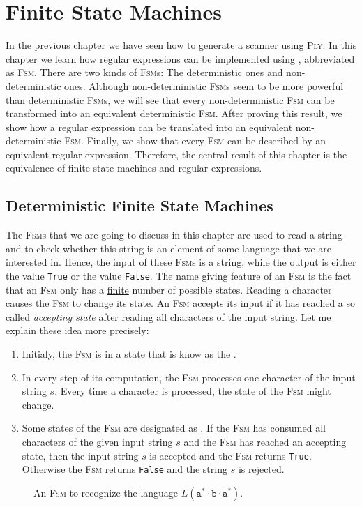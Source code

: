 \chapter{Finite State Machines\label{chapter:finit-state-machines.tex}} 
In the previous chapter we have seen how to generate a scanner using \textsc{Ply}.  In this chapter
we learn how regular expressions can be implemented using ,
abbreviated as \textsc{Fsm}.  There are two kinds of \textsc{Fsm}s: The deterministic ones and
non-deterministic ones.  Although non-deterministic \textsc{Fsm}s seem to be more powerful than
deterministic \textsc{Fsm}s, we will see that every non-deterministic \textsc{Fsm} can be transformed
into an equivalent deterministic \textsc{Fsm}.  After proving this result, we show how a regular
expression can be translated into an equivalent non-deterministic \textsc{Fsm}.  Finally, we show that every
\textsc{Fsm} can be described by an equivalent regular expression.  Therefore, the central result of
this chapter is the equivalence of finite state machines and regular expressions.


\section{Deterministic Finite State Machines}
The \textsc{Fsm}s that we are going to discuss in this chapter are used to read a string and
to check whether this string is an element of some language that we are interested in.  Hence, the input of these 
\textsc{Fsm}s is a string, while the output is either the value \texttt{True} or the value \texttt{False}.
The name giving feature of an \textsc{Fsm} is the fact that an \textsc{Fsm} only has a
\underline{finite} number of possible states.  Reading a character causes the \textsc{Fsm} to change its state.
An \textsc{Fsm} accepts its input if it has reached a so called \emph{accepting state} after reading
all characters of the input string.  Let me explain these idea more precisely:
\begin{enumerate}
\item Initialy, the \textsc{Fsm} is in a state that is know as the . 
\item In every step of its computation, the \textsc{Fsm} processes one character of the input string
      $s$.  Every time a character is processed, the state of the \textsc{Fsm} might change.
\item Some states of the \textsc{Fsm} are designated as .  
      If the \textsc{Fsm} has consumed all characters of the given input string $s$ and the \textsc{Fsm}
      has reached an accepting state, then the input string $s$ is accepted and the \textsc{Fsm}
      returns \texttt{True}.  Otherwise the \textsc{Fsm} returns \texttt{False} and the string $s$
      is rejected.
\end{enumerate}
\begin{figure}[!ht]
  \centering
   \caption{An \textsc{Fsm} to recognize the language $L(\texttt{a}^*\cdot\texttt{b}\cdot\texttt{a}^*)$.}
  \label{fig:abstara.dot}
\end{figure}


